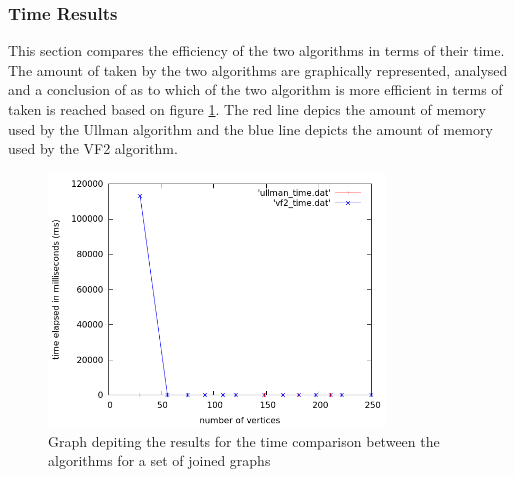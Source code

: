 \subsubsection{Time Results}
\label{Time Results}
This section compares the efficiency of the two algorithms in terms of their time. The amount of taken by the two algorithms are graphically 
represented, analysed and a conclusion of as to which of the two algorithm is more efficient in terms of taken is reached based on figure \ref{fig:time_comparison}.
The red line depics the amount of memory used by the Ullman algorithm and the blue line depicts the amount of memory used by the VF2 algorithm.
\begin{figure}[H]
  \begin{center}
      \includegraphics[width=0.8\textwidth]{time_comparison.png}
  \end{center}    
  \caption{Graph depiting the results for the time comparison between the algorithms for a set of joined graphs}
  \label{fig:time_comparison}
\end{figure}

